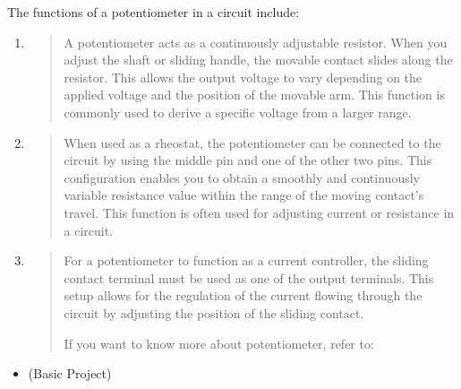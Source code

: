 \documentclass[a4paper,11pt,english]{sphinxmanual}
\begin{document}
\sphinxAtStartPar
The functions of a potentiometer in a circuit include:
\begin{enumerate}
%
\item {} 
\sphinxAtStartPar
{}
\begin{quote}

\sphinxAtStartPar
A potentiometer acts as a continuously adjustable resistor. When you adjust the shaft or sliding handle, the movable contact slides along the resistor. This allows the output voltage to vary depending on the applied voltage and the position of the movable arm. This function is commonly used to derive a specific voltage from a larger range.
\end{quote}

\item {} 
\sphinxAtStartPar
{}
\begin{quote}

\sphinxAtStartPar
When used as a rheostat, the potentiometer can be connected to the circuit by using the middle pin and one of the other two pins. This configuration enables you to obtain a smoothly and continuously variable resistance value within the range of the moving contact’s travel. This function is often used for adjusting current or resistance in a circuit.
\end{quote}

\item {} 
\sphinxAtStartPar
{}
\begin{quote}

\sphinxAtStartPar
For a potentiometer to function as a current controller, the sliding contact terminal must be used as one of the output terminals. This setup allows for the regulation of the current flowing through the circuit by adjusting the position of the sliding contact.

\sphinxAtStartPar
If you want to know more about potentiometer, refer to: 
\end{quote}

\end{enumerate}

\sphinxAtStartPar
{}
\begin{itemize}
\item {} 
\sphinxAtStartPar
{\hyperref[\detokenize{Basic_Project/Potentiometer:basic-potentiometer}]{}} (Basic Project)

\end{itemize}
\end{document}

